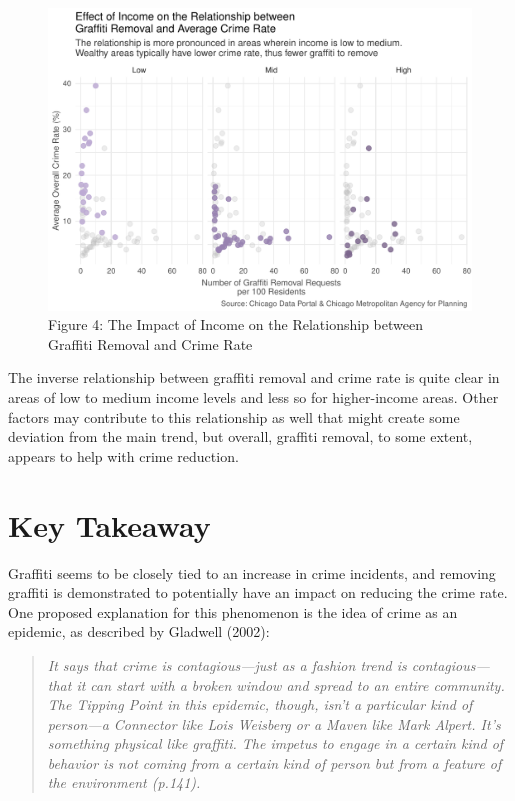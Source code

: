 \documentclass[
]{report}
\begin{document}
\begin{figure}[H]

\caption{Figure 4: The Impact of Income on the Relationship between
Graffiti Removal and Crime Rate}

{\centering \includegraphics{final_solo_files/figure-pdf/unnamed-chunk-5-1.pdf}

}

\end{figure}

The inverse relationship between graffiti removal and crime rate is
quite clear in areas of low to medium income levels and less so for
higher-income areas. Other factors may contribute to this relationship
as well that might create some deviation from the main trend, but
overall, graffiti removal, to some extent, appears to help with crime
reduction.

\hypertarget{key-takeaway}{%
\section{Key Takeaway}\label{key-takeaway}}

Graffiti seems to be closely tied to an increase in crime incidents, and
removing graffiti is demonstrated to potentially have an impact on
reducing the crime rate. One proposed explanation for this phenomenon is
the idea of crime as an epidemic, as described by Gladwell (2002):

\begin{quote}
\emph{It says that crime is contagious---just as a fashion trend is
contagious---that it can start with a broken window and spread to an
entire community. The Tipping Point in this epidemic, though, isn't a
particular kind of person---a Connector like Lois Weisberg or a Maven
like Mark Alpert. It's something physical like graffiti. The impetus to
engage in a certain kind of behavior is not coming from a certain kind
of person but from a feature of the environment (p.141).}
\end{quote}
\end{document}
